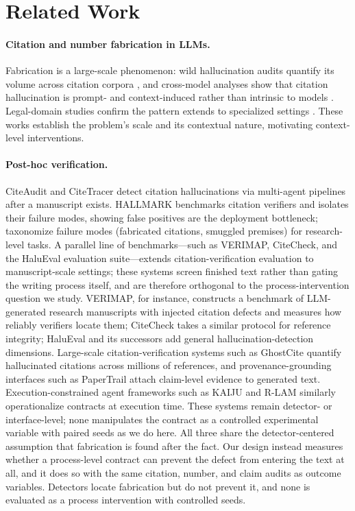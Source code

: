 \documentclass[10pt,twocolumn]{article}
\begin{document}
\section{Related Work}
\label{sec:related}

\paragraph{Citation and number fabrication in LLMs.}
Fabrication is a large-scale phenomenon: wild hallucination audits quantify its volume across citation corpora \citep{zhao2026wildhallucinations}, and cross-model analyses show that citation hallucination is prompt- and context-induced rather than intrinsic to models \citep{naser2026howllmscite}. Legal-domain studies confirm the pattern extends to specialized settings \citep{alrajeh2026legalcitations}. These works establish the problem's scale and its contextual nature, motivating context-level interventions.

\paragraph{Post-hoc verification.}
CiteAudit \citep{shi2026citeaudit} and CiteTracer \citep{li2026citetracer} detect citation hallucinations via multi-agent pipelines after a manuscript exists. HALLMARK \citep{reizinger2026hallmark} benchmarks citation verifiers and isolates their failure modes, showing false positives are the deployment bottleneck; \citet{banerjee2026failuremodes} taxonomize failure modes (fabricated citations, smuggled premises) for research-level tasks. A parallel line of benchmarks---such as VERIMAP, CiteCheck, and the HaluEval evaluation suite---extends citation-verification evaluation to manuscript-scale settings; these systems screen finished text rather than gating the writing process itself, and are therefore orthogonal to the process-intervention question we study. VERIMAP, for instance, constructs a benchmark of LLM-generated research manuscripts with injected citation defects and measures how reliably verifiers locate them; CiteCheck takes a similar protocol for reference integrity; HaluEval and its successors add general hallucination-detection dimensions. Large-scale citation-verification systems such as GhostCite \citep{ghostcite2026} quantify hallucinated citations across millions of references, and provenance-grounding interfaces such as PaperTrail \citep{papertrail2026} attach claim-level evidence to generated text. Execution-constrained agent frameworks such as KAIJU \citep{kaiju2026} and R-LAM \citep{rlam2026} similarly operationalize contracts at execution time. These systems remain detector- or interface-level; none manipulates the contract as a controlled experimental variable with paired seeds as we do here. All three share the detector-centered assumption that fabrication is found after the fact. Our design instead measures whether a process-level contract can prevent the defect from entering the text at all, and it does so with the same citation, number, and claim audits as outcome variables. Detectors locate fabrication but do not prevent it, and none is evaluated as a process intervention with controlled seeds.
\end{document}
